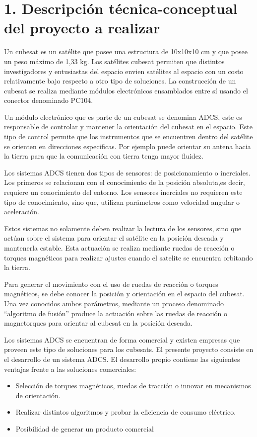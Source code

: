 \documentclass[
11pt, %
]{charter}
\begin{document}
\section{1. Descripción técnica-conceptual del proyecto a realizar}
\label{sec:descripcion}

Un cubesat es un satélite que posee una estructura de 10x10x10 cm y que posee un peso máximo de 1,33 kg. Los satélites cubesat permiten que distintos investigadores y entusiastas del espacio envien satélites al espacio con un costo relativamente bajo respecto a otro tipo de soluciones. La construcción de un  cubesat se realiza mediante módulos electrónicos ensamblados entre sí usando el conector denominado PC104. 

Un módulo electrónico que es parte de un cubesat se denomina ADCS, este es responsable de controlar y mantener la orientación del cubesat en el espacio. Este tipo de control  permite que los instrumentos que se encuentren dentro del satélite se orienten en direcciones especificas.  Por ejemplo puede orientar su antena hacia la tierra para que la comunicación con tierra tenga mayor fluidez. 

Los sistemas ADCS tienen dos tipos de sensores: de posicionamiento o inerciales. Los primeros se relacionan con el conocimiento de la posición absoluta,es decir, requiere un conocimiento del entorno. Los sensores inerciales no requieren este tipo de conocimiento, sino que, utilizan parámetros como velocidad angular o aceleración. 

Estos sistemas no solamente deben realizar la lectura de los sensores, sino que actúan sobre el sistema para orientar el satélite en la posición deseada y mantenerla estable. Esta actuación se realiza mediante ruedas de reacción o torques magnéticos para realizar ajustes cuando el satelite se encuentra orbitando la tierra.

Para generar el movimiento con el uso de ruedas de reacción o torques magnéticos, se debe  conocer la posición y orientación en el espacio del cubesat. Una vez conocidos ambos parámetros, mediante un proceso denominado “algoritmo de fusión” produce la actuación sobre las ruedas de reacción o magnetorques para orientar al cubesat en la posición deseada.

 Los sistemas ADCS se encuentran de forma comercial y  existen empresas que proveen este tipo de soluciones para los cubesats. El presente proyecto consiste en el desarrollo de un sistema ADCS. El desarrollo propio contiene las siguientes ventajas frente a las soluciones comerciales: 
\begin{itemize}
	\item Selección de torques magnéticos, ruedas de tracción o innovar en mecanismos de orientación. 
	\item Realizar distintos algoritmos y probar la eficiencia de consumo eléctrico. 
	\item Posibilidad de generar un producto comercial 
\end{itemize}
\end{document}
